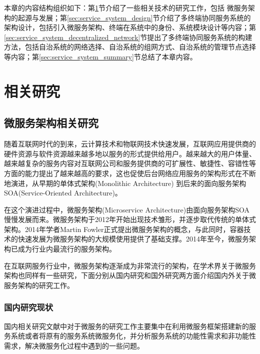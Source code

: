 本章的内容结构组织如下：第\ref{sec:service_system_related_work}节介绍了一些相关技术的研究工作，包括
微服务架构的起源与发展；第\ref{sec:service_system_design}节介绍了多终端协同服务系统的架构设计，包括引入微服务架构、终端在系统中的身份、系统模块设计等内容；第\ref{sec:service_system_decentralized_network}节提出了多终端协同服务系统的构建方法，包括自治系统的网络选择、自治系统的组网方式、自治系统的管理节点选择等内容；第\ref{sec:service_system_summary}节总结了本章内容。
\section{相关研究}\label{sec:service_system_related_work}


\subsection{微服务架构相关研究}

随着互联网时代的到来，云计算技术和物联网技术快速发展，互联网应用提供商的硬件资源与软件资源越来越多地以服务的形式提供给用户\cite{马斌2015海云协同环境下服务运营环境关键技术的探讨}。越来越大的用户体量、越来越复杂的服务内容对互联网公司和服务提供商的可扩展性、敏捷性、容错性等方面的能力提出了越来越高的要求，这也促使后台网络应用服务的架构形式在不断地演进，从早期的单体式架构(Monolithic Architecture) 到后来的面向服务架构 SOA(Service-Oriented Architecture)。

在这个演进过程中，微服务架构(Microservice Architecture)由面向服务架构SOA慢慢发展而来。微服务架构于2012年开始出现技术雏形，并逐步取代传统的单体式架构。2014年学者Martin Fowler正式提出微服务架构的概念\cite{lewis2014microservices}，与此同时，容器技术的快速发展为微服务架构的大规模使用提供了基础支撑。2014年至今，微服务架构已成为行业内最流行的服务架构。

在互联网服务行业中，微服务架构逐渐成为非常流行的架构，在学术界关于微服务架构也同样有一些研究，下面分别从国内研究和国外研究两方面介绍国内外关于微服务架构的研究工作。

\subsubsection{国内研究现状}
国内相关研究文献中对于微服务的研究工作主要集中在利用微服务框架搭建新的服务系统或者将原有的服务系统微服务化，并分析服务系统的功能性需求和非功能性需求，解决微服务化过程中遇到的一些问题。


